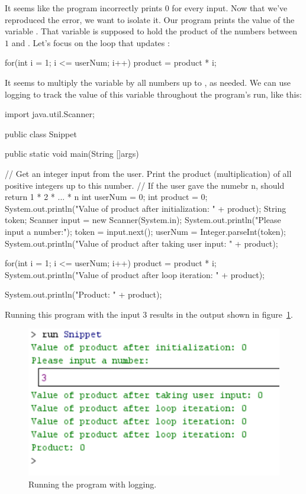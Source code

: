 It seems like the program incorrectly prints $0$ for every input. Now that we've reproduced the error, we want to isolate it. Our program prints the value of the variable . That variable is supposed to hold the product of the numbers between $1$ and . Let's focus on the loop that updates :

\begin{code}
for(int i = 1; i <= userNum; i++){
    product = product * i;
}
\end{code}

It seems to multiply the variable by all numbers up to , as needed. We can use logging to track the value of this variable throughout the program's run, like this:

\begin{code}
import java.util.Scanner;

public class Snippet{
    public static void main(String []args){
        // Get an integer input from the user. Print the product (multiplication) of all positive integers up to this number.
        // If the user gave the numebr n, should return 1 * 2 * ... * n
        int userNum = 0;
        int product = 0;
        System.out.println("Value of product after initialization: " + product);
        String token;
        Scanner input = new Scanner(System.in);
        System.out.println("Please input a number:");
        token = input.next();
        userNum = Integer.parseInt(token);
        System.out.println("Value of product after taking user input: " + product);
        
        for(int i = 1; i <= userNum; i++){
            product = product * i;
            System.out.println("Value of product after loop iteration: " + product);
        }
        
        System.out.println("Product: " + product);
    }
}
\end{code}

Running this program with the input $3$ results in the output shown in figure~\ref{fig:logging}. 

\begin{figure}[h!]
\centering
\includegraphics[scale=0.8]{lectures/images/logging.PNG}
\caption{Running the program with logging.}
\label{fig:logging}
\end{figure}

